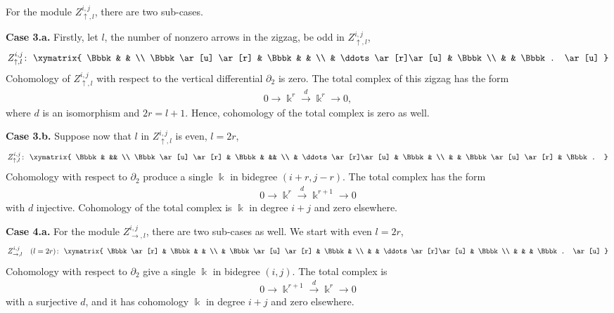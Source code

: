 \documentclass[pdftex]{sigma}
\theoremstyle{definition}
\numberwithin{equation}{section}
\def\dif{\partial}
\def\lra{{\longrightarrow}}
\begin{document}
For the module $Z^{i,j}_{\uparrow,l}$, there are two sub-cases.

{\bf Case 3.a.}
Firstly, let $l$, the number of nonzero arrows in the zigzag, be odd in $Z^{i,j}_{\uparrow,l}$,
 \[
Z^{i,j}_{\uparrow,l}\colon \
\begin{gathered}
\xymatrix{
 \Bbbk & & \\
 \Bbbk\ar[u] \ar[r] & \Bbbk & & \\
 & \ddots \ar[r]\ar[u] & \Bbbk \\
 & & \Bbbk. \ar[u]
}
\end{gathered}
\]
Cohomology of $Z^{i,j}_{\uparrow,l}$ with respect to the vertical
differential $\dif_2$ is zero. The total complex of this zigzag
has the form
\begin{gather*}0 \lra \Bbbk^r \stackrel{d}{\lra} \Bbbk^r \lra 0, \end{gather*}
where $d$ is an isomorphism and $2r = l+1$. Hence, cohomology
of the total complex is zero as well.

{\bf Case 3.b.} Suppose now that $l$ in $Z^{i,j}_{\uparrow,l}$ is even, $l=2r$,
 \[
Z^{i,j}_{\uparrow,l}\colon \
\begin{gathered}
\xymatrix{
 \Bbbk & && \\
 \Bbbk\ar[u] \ar[r] & \Bbbk & && \\
 & \ddots \ar[r]\ar[u] & \Bbbk & \\
 & & \Bbbk \ar[u] \ar[r] & \Bbbk.
}
\end{gathered}
\]
Cohomology with respect to $\dif_2$ produce a single $\Bbbk$ in
bidegree $(i+r,j-r)$. The total complex has the form
\begin{gather*} 0 \lra \Bbbk^r \stackrel{d}{\lra} \Bbbk^{r+1} \lra 0 \end{gather*}
with $d$ injective. Cohomology of the total complex is $\Bbbk$
in degree $i+j$ and zero elsewhere.

{\bf Case 4.a.}
For the module $Z^{i,j}_{\rightarrow,l}$, there are two sub-cases as well. We start with even $l=2r$,
\[
Z^{i,j}_{\rightarrow,l} \quad (l=2r)\colon \
\begin{gathered}
\xymatrix{
 \Bbbk \ar[r] & \Bbbk & & \\
 & \Bbbk\ar[u] \ar[r] & \Bbbk & \\
 & & \ddots \ar[r]\ar[u] & \Bbbk\\
 & & & \Bbbk. \ar[u]
}
\end{gathered}
\]
Cohomology with respect to $\dif_2$ give a single $\Bbbk$ in
bidegree $(i,j)$. The total complex is
\begin{gather*} 0 \lra \Bbbk^{r+1} \stackrel{d}{\lra} \Bbbk^r \lra 0\end{gather*}
with a surjective $d$, and it has cohomology $\Bbbk$
in degree $i+j$ and zero elsewhere.
\end{document}
